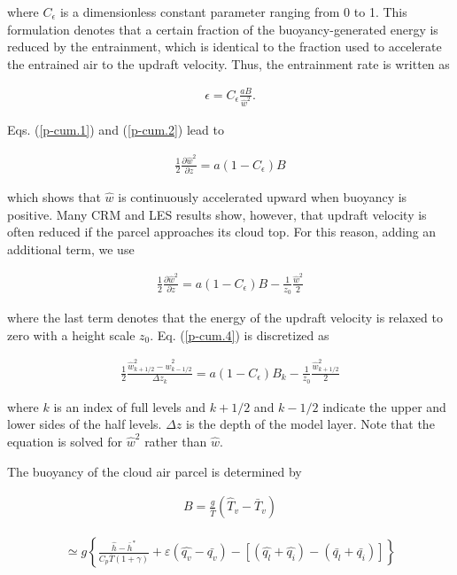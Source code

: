 where \(C_\epsilon\) is a dimensionless constant parameter ranging from
0 to 1. This formulation denotes that a certain fraction of the
buoyancy-generated energy is reduced by the entrainment, which is
identical to the fraction used to accelerate the entrained air to the
updraft velocity. Thus, the entrainment rate is written as

\begin{eqnarray}
 \epsilon = C_\epsilon\frac{aB}{\hat{w}^2}. \label{p-cum.2}
\end{eqnarray}

Eqs. (\ref{p-cum.1}) and (\ref{p-cum.2}) lead to

\begin{eqnarray}
 \frac{1}{2}\frac{\partial \hat{w}^2}{\partial z} = a(1 - C_\epsilon) B
\end{eqnarray}

which shows that \(\hat{w}\) is continuously accelerated upward when
buoyancy is positive. Many CRM and LES results show, however, that
updraft velocity is often reduced if the parcel approaches its cloud
top. For this reason, adding an additional term, we use

\begin{eqnarray}
 \frac{1}{2}\frac{\partial \hat{w}^2}{\partial z} = a(1 - C_\epsilon) B - \frac{1}{z_0}\frac{\hat{w}^2}{2}\label{p-cum.4}
\end{eqnarray}

where the last term denotes that the energy of the updraft velocity is
relaxed to zero with a height scale \(z_0\). Eq. (\ref{p-cum.4}) is
discretized as

\begin{eqnarray}
 \frac{1}{2}\frac{\hat{w}^2_{k+1/2} - \hat{w}^2_{k-1/2}}{\Delta z_k} = a(1 - C_\epsilon) B_k - \frac{1}{z_0}\frac{\hat{w}_{k+1/2}^2}{2} \label{p-cum.A5}
\end{eqnarray}

where \(k\) is an index of full levels and \(k+1/2\) and \(k-1/2\)
indicate the upper and lower sides of the half levels. \(\Delta z\) is
the depth of the model layer. Note that the equation is solved for
\(\hat{w}^2\) rather than \(\hat{w}\).

The buoyancy of the cloud air parcel is determined by

\begin{eqnarray}
 B  =   \frac{g}{\bar{T}} ( \hat{T}_v - \bar{T}_v )
\end{eqnarray}

\begin{eqnarray}
 \simeq g \left\{ \frac{\hat{h} - \bar{h}^*}{C_p \bar{T}(1 + \gamma)} + \varepsilon(\hat{q_v}-\bar{q_v}) - \left[ (\hat{q_l}+\hat{q_i}) - (\bar{q_l}+\bar{q_i}) \right] \right\}
\end{eqnarray}

